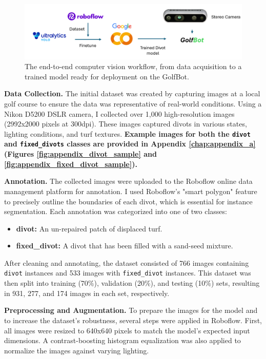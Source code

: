 \begin{figure}[h!]
    \centering
    \includegraphics[width=\linewidth]{figures/datasetworkflow.png}
    \caption{The end-to-end computer vision workflow, from data acquisition to a trained model ready for deployment on the GolfBot.}
    \label{fig:cv_workflow}
\end{figure}

\textbf{Data Collection.}
The initial dataset was created by capturing images at a local golf course to ensure the data was representative of real-world conditions. Using a Nikon D5200 DSLR camera, I collected over 1,000 high-resolution images (2992x2000 pixels at 300dpi). These images captured divots in various states, lighting conditions, and turf textures. \textbf{Example images for both the \texttt{divot} and \texttt{fixed\_divots} classes are provided in Appendix \ref{chap:appendix_a} (Figures \ref{fig:appendix_divot_sample} and \ref{fig:appendix_fixed_divot_sample}).}

\textbf{Annotation.}
The collected images were uploaded to the Roboflow online data management platform for annotation. I used Roboflow's "smart polygon" feature to precisely outline the boundaries of each divot, which is essential for instance segmentation. Each annotation was categorized into one of two classes:
\begin{itemize}
    \item \textbf{divot:} An un-repaired patch of displaced turf.
    \item \textbf{fixed\_divot:} A divot that has been filled with a sand-seed mixture.
\end{itemize}
After cleaning and annotating, the dataset consisted of 766 images containing \texttt{divot} instances and 533 images with \texttt{fixed\_divot} instances. This dataset was then split into training (70\%), validation (20\%), and testing (10\%) sets, resulting in 931, 277, and 174 images in each set, respectively.

\textbf{Preprocessing and Augmentation.}
To prepare the images for the model and to increase the dataset's robustness, several steps were applied in Roboflow. First, all images were resized to 640x640 pixels to match the model's expected input dimensions. A contrast-boosting histogram equalization was also applied to normalize the images against varying lighting.

